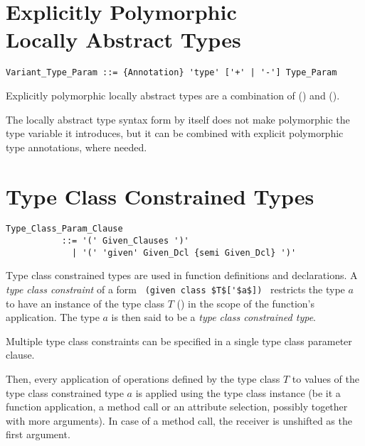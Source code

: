 \section[Explicitly Polymorphic Locally Abstract Types]{Explicitly Polymorphic \\ Locally Abstract Types}
\label{sec:locally-abstract-polymorphic-types}

\grammar\begin{lstlisting}
Variant_Type_Param ::= {Annotation} 'type' ['+' | '-'] Type_Param
\end{lstlisting}

Explicitly polymorphic locally abstract types are a combination of () and ().

The locally abstract type syntax form by itself does not make polymorphic the type variable it introduces, but it can be combined with explicit polymorphic type annotations, where needed. 





\section{Type Class Constrained Types}
\label{sec:type-class-constrained-types}

\grammar\begin{lstlisting}
Type_Class_Param_Clause 
           ::= '(' Given_Clauses ')'
             | '(' 'given' Given_Dcl {semi Given_Dcl} ')'
\end{lstlisting}

Type class constrained types are used in function definitions and declarations. A {\em type class constraint} of a form ~\lstinline!(given class $T$['$a$])!~ restricts the type $a$ to have an instance of the type class $T$ () in the scope of the function's application. The type $a$ is then said to be a {\em type class constrained type}. 

Multiple type class constraints can be specified in a single type class parameter clause. 

Then, every application of operations defined by the type class $T$ to values of the type class constrained type $a$ is applied using the type class instance (be it a function application, a method call or an attribute selection, possibly together with more arguments). In case of a method call, the receiver is unshifted as the first argument.  

